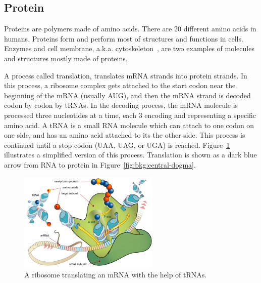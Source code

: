 \subsection{Protein}
Proteins are polymers made of amino acids. There are 20 different amino acids in humans. Proteins form and perform most of structures and functions in cells. Enzymes and cell membrane, a.k.a. cytoskeleton~\cite[Ch. 16]{the-cell}, are two examples of molecules and structures mostly made of proteins.

A process called translation, translates mRNA strands into protein strands. In this process, a ribosome complex gets attached to the start codon near the beginning of the mRNA (usually AUG), and then the mRNA strand is decoded codon by codon by tRNAs. In the decoding process, the mRNA molecule is processed three nucleotides at a time, each 3 encoding and representing a specific amino acid. A tRNA is a small RNA molecule which can attach to one codon on one side, and has an amino acid attached to its the other side. This process is continued until a stop codon (UAA, UAG, or UGA) is reached. Figure~\ref{fig:bkg:translation} illustrates a simplified version of this process. Translation is shown as a dark blue arrow from RNA to protein in Figure~\ref{fig:bkg:central-dogma}.

\begin{figure}[!ht]
  \centering
  \includegraphics[width=0.6\textwidth]{figs/background/640px-Ribosome_mRNA_translation_en}
  \caption{A ribosome translating an mRNA with the help of tRNAs.}
  \label{fig:bkg:translation}
\end{figure}


